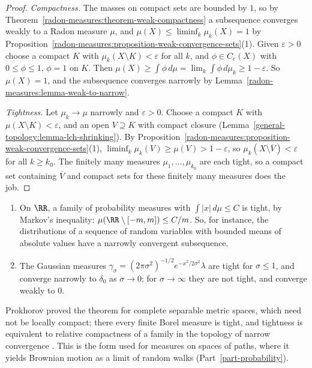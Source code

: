\begin{proof}
\emph{Compactness.} The masses on compact sets are bounded by $1$, so by Theorem~\ref{radon-measures:theorem-weak-compactness} a subsequence converges weakly to a Radon measure $\mu$, and
$\mu(X) \leq \liminf_k\mu_k(X) = 1$ by Proposition~\ref{radon-measures:proposition-weak-convergence-sets}(1). Given $\varepsilon > 0$ choose a compact $K$ with $\mu_k(X \setminus K) < \varepsilon$ for all
$k$, and $\phi \in C_c(X)$ with $0 \leq \phi \leq 1$, $\phi = 1$ on $K$. Then $\mu(X) \geq \int\phi\,d\mu = \lim_k\int\phi\,d\mu_k \geq 1 - \varepsilon$. So $\mu(X) = 1$, and the subsequence
converges narrowly by Lemma~\ref{radon-measures:lemma-weak-to-narrow}.

\emph{Tightness.} Let $\mu_k \to \mu$ narrowly and $\varepsilon > 0$. Choose a compact $K$ with $\mu(X \setminus K) < \varepsilon$, and an open $V \supseteq K$ with compact closure
(Lemma~\ref{general-topology:lemma-lch-shrinking}). By Proposition~\ref{radon-measures:proposition-weak-convergence-sets}(1), $\liminf_k\mu_k(V) \geq \mu(V) > 1 - \varepsilon$, so
$\mu_k(X \setminus \overline{V}) < \varepsilon$ for all $k \geq k_0$. The finitely many measures $\mu_1, \ldots, \mu_{k_0}$ are each tight, so a compact set containing $\overline{V}$ and
compact sets for these finitely many measures does the job.
\end{proof}

\begin{example}\label{radon-measures:example-prokhorov}
\begin{enumerate}
\item On $\RR$, a family of probability measures with $\int|x|\,d\mu \leq C$ is tight, by Markov's inequality: $\mu(\RR \setminus [-m, m]) \leq C/m$. So, for instance, the distributions of a sequence of
random variables with bounded means of absolute values have a narrowly convergent subsequence.
\item The Gaussian measures $\gamma_\sigma = (2\pi\sigma^2)^{-1/2}e^{-x^2/2\sigma^2}\lambda$ are tight for $\sigma \leq 1$, and converge narrowly to $\delta_0$ as $\sigma \to 0$; for $\sigma \to \infty$ they are
not tight, and converge weakly to $0$.
\end{enumerate}
\end{example}

Prokhorov proved the theorem for complete separable metric spaces, which need not be locally compact; there every finite Borel measure is tight, and tightness is equivalent to relative compactness of
a family in the topology of narrow convergence \cite[Section 5]{billingsley-convergence}. This is the form used for measures on spaces of paths, where it yields Brownian motion as a limit of random
walks (Part~\ref{part-probability}).

